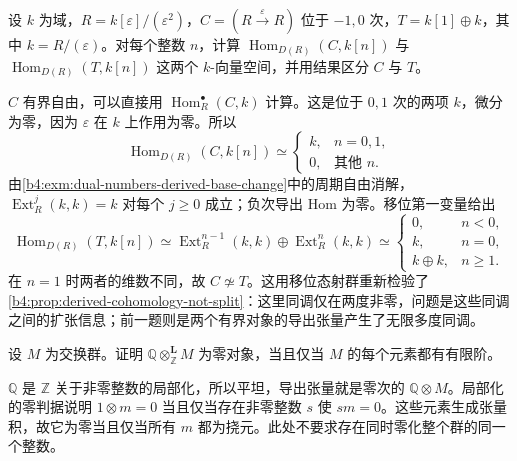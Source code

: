 \begin{exercise}\label{b4:ex:18-cohomology-does-not-determine}
	设 \(k\) 为域，\(R=k[\varepsilon]/(\varepsilon^2)\)，\(C=(R\xrightarrow{\varepsilon}R)\) 位于 \(-1,0\) 次，\(T=k[1]\oplus k\)，其中 \(k=R/(\varepsilon)\)。对每个整数 \(n\)，计算 \(\operatorname{Hom}_{D(R)}(C,k[n])\) 与 \(\operatorname{Hom}_{D(R)}(T,k[n])\) 这两个 \(k\)-向量空间，并用结果区分 \(C\) 与 \(T\)。
\end{exercise}
\begin{solution}
	\(C\) 有界自由，可以直接用 \(\operatorname{Hom}_R^\bullet(C,k)\) 计算。这是位于 \(0,1\) 次的两项 \(k\)，微分为零，因为 \(\varepsilon\) 在 \(k\) 上作用为零。所以
	\[
		\operatorname{Hom}_{D(R)}(C,k[n])\simeq
		\begin{cases}k,&n=0,1,\\0,&\text{其他 }n.\end{cases}
	\]
	由\cref{b4:exm:dual-numbers-derived-base-change}中的周期自由消解，\(\operatorname{Ext}_R^j(k,k)=k\) 对每个 \(j\ge0\) 成立；负次导出 Hom 为零。移位第一变量给出
	\[
		\operatorname{Hom}_{D(R)}(T,k[n]) \simeq\operatorname{Ext}_R^{n-1}(k,k)\oplus\operatorname{Ext}_R^n(k,k)
		\simeq\begin{cases}0,&n<0,\\k,&n=0,\\k\oplus k,&n\ge1.\end{cases}
	\]
	在 \(n=1\) 时两者的维数不同，故 \(C\not\simeq T\)。这用移位态射群重新检验了\cref{b4:prop:derived-cohomology-not-split}：这里同调仅在两度非零，问题是这些同调之间的扩张信息；前一题则是两个有界对象的导出张量产生了无限多度同调。
\end{solution}

\begin{exercise}\label{b4:ex:18-rational-vanishing}
	设 \(M\) 为交换群。证明 \(\mathbb Q\otimes_{\mathbb Z}^{\mathbf L}M\) 为零对象，当且仅当 \(M\) 的每个元素都有有限阶。
\end{exercise}
\begin{solution}
	\(\mathbb Q\) 是 \(\mathbb Z\) 关于非零整数的局部化，所以平坦，导出张量就是零次的 \(\mathbb Q\otimes M\)。局部化的零判据说明 \(1\otimes m=0\) 当且仅当存在非零整数 \(s\) 使 \(sm=0\)。这些元素生成张量积，故它为零当且仅当所有 \(m\) 都为挠元。此处不要求存在同时零化整个群的同一个整数。
\end{solution}

